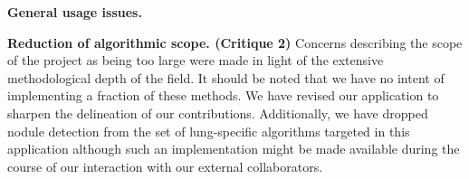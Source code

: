 \documentclass[11pt,]{article}
\begin{document}
\textbf{General usage issues.}

\textbf{Reduction of algorithmic scope. (Critique 2)} Concerns
describing the scope of the project as being too large were made in
light of the extensive methodological depth of the field. It should be
noted that we have no intent of implementing a fraction of these
methods. We have revised our application to sharpen the delineation of
our contributions. Additionally, we have dropped nodule detection from
the set of lung-specific algorithms targeted in this application
although such an implementation might be made available during the
course of our interaction with our external collaborators.

\hypertarget{refs}{}
\end{document}
